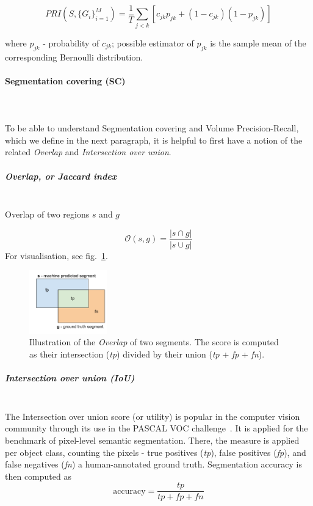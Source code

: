 
\[
PRI(S,\{G_{i}\}_{i=1}^{M})=\frac{1}{T}\sum\limits _{j<k}\left[c_{jk}p_{jk}+\left(1-c_{jk}\right)\left(1-p_{jk}\right)\right]
\]


where $p_{jk}$ - probability of $c_{jk}$; possible estimator of
$p_{jk}$ is the sample mean of the corresponding Bernoulli distribution.


\paragraph{Segmentation covering (SC)}\mbox{}\\\mbox{}\\
To be able to understand Segmentation covering and Volume Precision-Recall, which we define in the next paragraph, it is helpful to first have a notion of the related \textit{Overlap} and \textit{Intersection over union}.

\subparagraph*{Overlap, or Jaccard index}\mbox{}\\
Overlap of two regions %
$s$ and $g$

\[
\mathcal{O}\left(s,g\right)=\frac{\left|s\cap g\right|}{\left|s\cup g\right|}
\]
For visualisation, see fig.~\ref{fig:overlap-IoU}.

\begin{figure}[ht!]
\centering
\includegraphics[width=0.3\textwidth]{images/scoring_fcns/intersection-over-union_score_illustrated.png}
\caption{Illustration of the \textit{Overlap} of two segments. The score is computed as their intersection (\textit{tp}) divided by their union (\textit{tp} + \textit{fp} + \textit{fn}).}
\label{fig:overlap-IoU}
\end{figure}

\subparagraph*{Intersection over union (IoU)}\mbox{}\\
The Intersection over union score (or utility) %
is popular in the computer vision community through its use in the PASCAL VOC challenge~\cite{pascal-voc-2012}. It is applied for the benchmark of pixel-level semantic segmentation. There, the measure is applied per object class, counting the pixels - true positives (\textit{tp}), false positives (\textit{fp}), and false negatives (\textit{fn}) \wrt a human-annotated ground truth. Segmentation accuracy is then computed as
\[
 \text{accuracy} = \frac{\textit{tp}}{\textit{tp} + \textit{fp} + \textit{fn}}
\]


